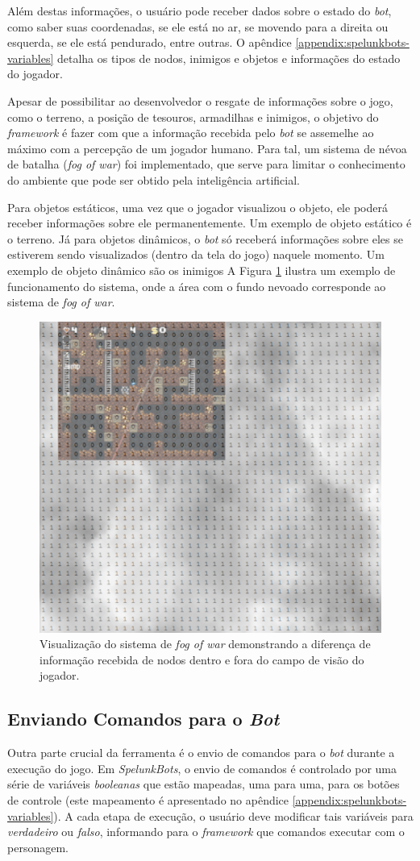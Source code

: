 Além destas informações, o usuário pode receber dados sobre o estado do
\textit{bot}, como saber suas coordenadas, se ele está no ar, se movendo para a
direita ou esquerda, se ele está pendurado, entre outras. O apêndice
\ref{appendix:spelunkbots-variables} detalha os tipos de nodos, inimigos e
objetos e informações do estado do jogador.

Apesar de possibilitar ao desenvolvedor o resgate de informações sobre o jogo,
como o terreno, a posição de tesouros, armadilhas e inimigos, o objetivo do
\textit{framework} é fazer com que a informação recebida pelo \textit{bot} se
assemelhe ao máximo com a percepção de um jogador humano. Para tal, um sistema
de névoa de batalha (\textit{fog of war}) foi implementado, que serve para
limitar o conhecimento do ambiente que pode ser obtido pela inteligência
artificial.

Para objetos estáticos, uma vez que o jogador visualizou o objeto, ele poderá
receber informações sobre ele permanentemente. Um exemplo de objeto estático é o
terreno. Já para objetos dinâmicos, o \textit{bot} só receberá informações sobre
eles se estiverem sendo visualizados (dentro da tela do jogo) naquele momento.
Um exemplo de objeto dinâmico são os inimigos A Figura \ref{fig:spelunkbots-fow}
ilustra um exemplo de funcionamento do sistema, onde a área com o fundo nevoado
corresponde ao sistema de \textit{fog of war}.

\begin{figure}[htb!]
\centering
\includegraphics[width=.60\textwidth]{fig/spelunkbots-fow.pdf}
\caption {Visualização do sistema de \textit{fog of war} demonstrando a
diferença de informação recebida de nodos dentro e fora do campo de visão do
jogador.}
\label{fig:spelunkbots-fow}
\end{figure}


\subsection{Enviando Comandos para o \textit{Bot}}
Outra parte crucial da ferramenta é o envio de comandos para o \textit{bot}
durante a execução do jogo. Em \textit{SpelunkBots}, o envio de comandos é
controlado por uma série de variáveis \textit{booleanas} que estão mapeadas, uma
para uma, para os botões de controle (este mapeamento é apresentado no apêndice
\ref{appendix:spelunkbots-variables}). A cada etapa de execução, o usuário deve
modificar tais variáveis para \textit{verdadeiro} ou \textit{falso}, informando
para o \textit{framework} que comandos executar com o personagem.

